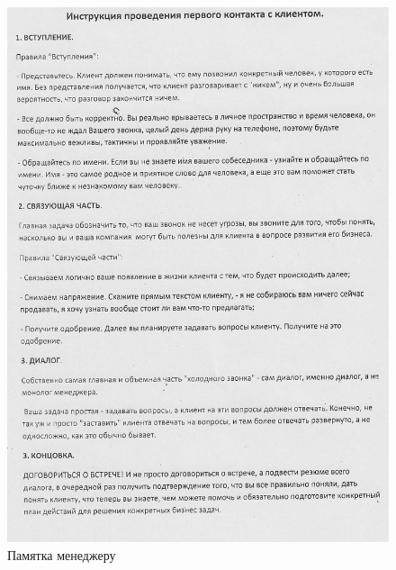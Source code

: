 %
%
%
%
%
\begin{figure}
\begin{center}
 \includegraphics[height=0.8\textheight, keepaspectratio]{Pics/I.2.jpg}
\end{center}
 \caption{Памятка менеджеру}
 \label{pic:I.2.jpg}
\end{figure}
\clearpage

